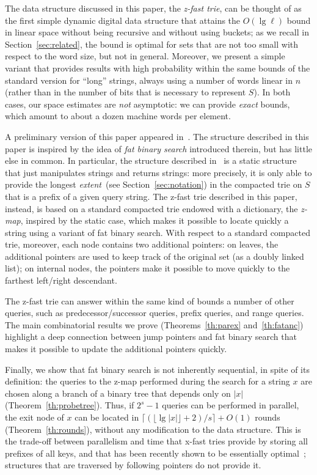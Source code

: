 \documentclass[a4paper]{article}
\newcommand{\?}{\mskip1.5mu}
\begin{document}
The data structure discussed in this paper, the \emph{z-fast trie}, can
be thought of as the first simple dynamic digital data structure that attains the $O(\lg\ell)$ bound 
in linear space without being
recursive and without using buckets; as we recall in Section~\ref{sec:related}, 
the bound is optimal for sets that are not too small with respect to the word size, but not in general.
Moreover, we present a simple variant that provides results with high
probability within the same bounds of the standard version for ``long'' strings, always
using a number of words linear in $n$ (rather than in the number of bits that is
necessary to represent $S$). In both cases, our space estimates are \emph{not}
asymptotic: we can provide \emph{exact} bounds, which amount to about a dozen
machine words per element.

A preliminary version of this paper appeared in~\cite{BBVDZT}.
The structure described in this paper is inspired by the idea of \emph{fat
binary search} introduced therein, but has little else in common. In particular,
the structure described in~\cite{BBPMMPH} is a static structure that just
manipulates strings and returns strings: more precisely, it is only able to provide
the longest \emph{extent}~(see Section~\ref{sec:notation}) in the compacted trie
on $S$ that is a prefix of a given query string. The z-fast trie described
in this paper, instead, is
based on a standard compacted trie endowed with a dictionary, the \emph{z-map},
inspired by the static case, which makes it possible to locate quickly a string
using a variant of fat binary search. With respect to a standard compacted trie, moreover, each node contains two additional
pointers: on leaves, the additional pointers are used to keep track of the original set (as 
a doubly linked list); on internal nodes, the pointers make it possible to move
quickly to the farthest left/right descendant.

The z-fast trie can answer within the same kind of bounds
a number of other queries, such as predecessor/successor queries, prefix queries, and range queries.
The main combinatorial results we prove (Theorems~\ref{th:parex}
and~\ref{th:fatanc}) 
highlight a deep connection between jump pointers and fat
binary search that makes it possible to update the additional pointers quickly.

Finally, we show that fat binary search is not inherently sequential, in spite of its definition: the 
queries to the z-map performed during the search for a string $x$ are chosen along a branch of a binary tree that depends only on $|x|$ (Theorem~\ref{th:probetree}).
Thus, if $2^s-1$ queries can be performed in parallel, the exit node of $x$ can be located in $\bigl\lceil(\lfloor\lg|x|\rfloor+2)/s\bigr\rceil+O(1)$ rounds 
(Theorem~\ref{th:rounds}), without any modification to the data structure. This is the trade-off between parallelism and time
that x-fast tries provide by storing all prefixes of all keys, and that has been recently shown to be essentially optimal~\cite{Afshani2025Cell}; 
structures that are traversed by following pointers do not provide it.
\end{document}
